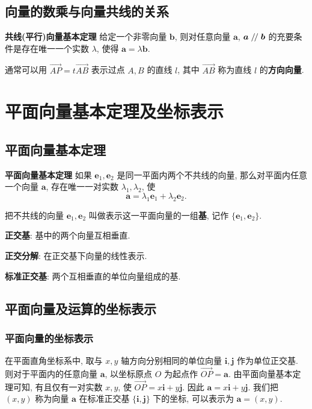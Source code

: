 \documentclass[titlepage]{ctexart}
\renewcommand\parallel{\mathrel{/\mskip-2.5mu/}}
\begin{document}
\subsection{向量的数乘与向量共线的关系}

\textbf{共线(平行)向量基本定理} \quad 给定一个非零向量 $\boldsymbol{b}$, 则对任意向量 $\boldsymbol{a}$,
$\boldsymbol{a} \parallel \boldsymbol{b}$ 的充要条件是存在唯一一个实数 $\lambda$, 使得 $\boldsymbol{a} = \lambda \boldsymbol{b}$.

通常可以用 $\overrightarrow{AP} = t\overrightarrow{AB}$ 表示过点 $A, B$ 的直线 $l$, 其中 $\overrightarrow{AB}$ 称为直线 $l$ 的\textbf{方向向量}.


\section{平面向量基本定理及坐标表示}

\subsection{平面向量基本定理}

\textbf{平面向量基本定理} \quad 如果 $\boldsymbol{e}_1, \boldsymbol{e}_2$ 是同一平面内两个不共线的向量, 那么对平面内任意一个向量 $\boldsymbol{a}$,
存在唯一一对实数 $\lambda_1, \lambda_2$, 使
\[
\boldsymbol{a} = \lambda_1 \boldsymbol{e}_1 + \lambda_2 \boldsymbol{e}_2.
\]

把不共线的向量 $\boldsymbol{e}_1, \boldsymbol{e}_2$ 叫做表示这一平面向量的一组\textbf{基}, 记作 $\{\boldsymbol{e}_1, \boldsymbol{e}_2\}$.

\textbf{正交基}: 基中的两个向量互相垂直.

\textbf{正交分解}: 在正交基下向量的线性表示.

\textbf{标准正交基}: 两个互相垂直的单位向量组成的基.

\subsection{平面向量及运算的坐标表示}

\subsubsection{平面向量的坐标表示}

在平面直角坐标系中, 取与 $x, y$ 轴方向分别相同的单位向量 $\boldsymbol{i}, \boldsymbol{j}$ 作为单位正交基. 
则对于平面内的任意向量 $\boldsymbol{a}$, 以坐标原点 $O$ 为起点作 $\overrightarrow{OP} = \boldsymbol{a}$.
由平面向量基本定理可知, 有且仅有一对实数 $x, y$, 使 $\overrightarrow{OP} = x\boldsymbol{i} + y\boldsymbol{j}$.
因此 $\boldsymbol{a} = x\boldsymbol{i} + y\boldsymbol{j}$. 
我们把 $(x, y)$ 称为向量 $\boldsymbol{a}$ 在标准正交基 $\{\boldsymbol{i}, \boldsymbol{j}\}$ 下的坐标, 可以表示为 $\boldsymbol{a} = (x, y)$.
\end{document}
